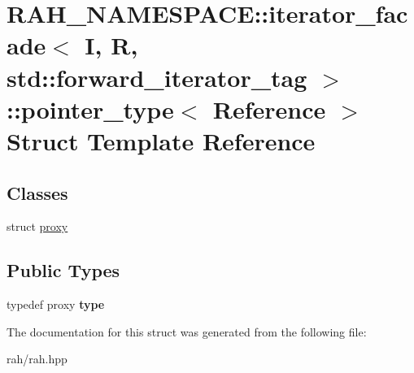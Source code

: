 \hypertarget{struct_r_a_h___n_a_m_e_s_p_a_c_e_1_1iterator__facade_3_01_i_00_01_r_00_01std_1_1forward__iterator__tag_01_4_1_1pointer__type}{}\section{R\+A\+H\+\_\+\+N\+A\+M\+E\+S\+P\+A\+CE\+::iterator\+\_\+facade$<$ I, R, std\+::forward\+\_\+iterator\+\_\+tag $>$\+::pointer\+\_\+type$<$ Reference $>$ Struct Template Reference}
\label{struct_r_a_h___n_a_m_e_s_p_a_c_e_1_1iterator__facade_3_01_i_00_01_r_00_01std_1_1forward__iterator__tag_01_4_1_1pointer__type}
\subsection*{Classes}
\begin{DoxyCompactItemize}
\item 
struct \mbox{\hyperlink{struct_r_a_h___n_a_m_e_s_p_a_c_e_1_1iterator__facade_3_01_i_00_01_r_00_01std_1_1forward__iterato3fe5d6b1f3640cd0444b883f952b0798}{proxy}}
\end{DoxyCompactItemize}
\subsection*{Public Types}
\begin{DoxyCompactItemize}
\item 
\mbox{\label{struct_r_a_h___n_a_m_e_s_p_a_c_e_1_1iterator__facade_3_01_i_00_01_r_00_01std_1_1forward__iterator__tag_01_4_1_1pointer__type_ac9b6d863dcd7e0b5b89830a56c4c34f8}} 
typedef proxy {\bfseries type}
\end{DoxyCompactItemize}


The documentation for this struct was generated from the following file\+:\begin{DoxyCompactItemize}
\item 
rah/rah.\+hpp\end{DoxyCompactItemize}
